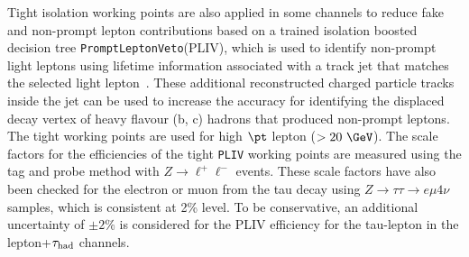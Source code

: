 \documentclass[PAPER, coverpage, atlasdraft=true, texlive=2016, UKenglish]{\ATLASLATEXPATH atlasdoc} %
\begin{document}
Tight isolation working points are also applied in some channels to reduce fake and non-prompt lepton contributions based on a trained isolation boosted decision tree \texttt{PromptLeptonVeto}(PLIV), which is used to identify non-prompt light leptons using lifetime information associated with a track jet that matches the selected light lepton~\cite{ATLAS-CONF-2019-045}. These additional reconstructed charged particle tracks inside the jet can be
used to increase the accuracy for identifying the displaced decay vertex of heavy flavour (b, c) hadrons that produced non-prompt leptons.
The tight working points are used for high $\pt$ lepton ($>20~\GeV$).
The scale factors for the efficiencies of the tight \texttt{PLIV} working points are measured using the tag and probe method
with $Z\rightarrow \ell^+\ell^-$ events. These scale factors have also been checked for the electron or muon from the tau decay
using $Z\rightarrow\tau\tau\rightarrow e\mu4\nu$ samples, which is consistent at 2\% level. To be conservative, an
additional uncertainty of $\pm 2\%$ is considered for the PLIV efficiency for the tau-lepton in the lepton+$\tau_\text{had}$ channels.
\end{document}
